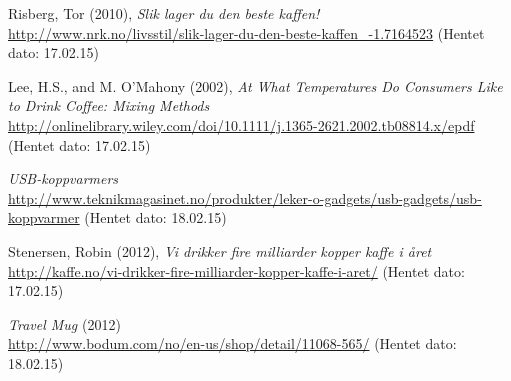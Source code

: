 \documentclass[abstract=on]{scrreprt}
\begin{document}
\scriptsize


\tableofcontents







\begin{thebibliography}{10}
Risberg, Tor (2010), \textit{Slik lager du den beste kaffen!} \\
\url{http://www.nrk.no/livsstil/slik-lager-du-den-beste-kaffen_-1.7164523} (Hentet dato: 17.02.15)

Lee, H.S., and M. O'Mahony (2002), \textit{At What Temperatures Do Consumers Like to Drink Coffee: Mixing Methods} \\
\url{http://onlinelibrary.wiley.com/doi/10.1111/j.1365-2621.2002.tb08814.x/epdf} (Hentet dato: 17.02.15)

\textit{USB-koppvarmers}  \\
\url{http://www.teknikmagasinet.no/produkter/leker-o-gadgets/usb-gadgets/usb-koppvarmer} (Hentet dato: 18.02.15)

Stenersen, Robin (2012), \textit{Vi drikker fire milliarder kopper kaffe i året} \\
\url{http://kaffe.no/vi-drikker-fire-milliarder-kopper-kaffe-i-aret/} (Hentet dato: 17.02.15)

\textit{Travel Mug} (2012)\\
\url{http://www.bodum.com/no/en-us/shop/detail/11068-565/} (Hentet dato: 18.02.15)

\end{thebibliography}

%
%
\end{document}

